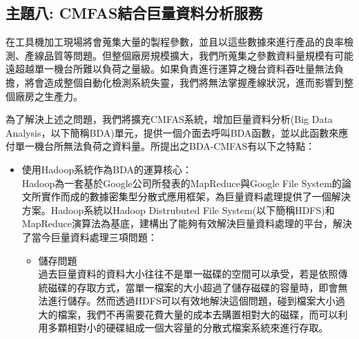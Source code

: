 \documentclass[CJK,12pt,t]{article}
\begin{document}
\begin{CJK*}{UTF8}{bkai}   %









\section{主題八: CMFAS結合巨量資料分析服務}


		在工具機加工現場將會蒐集大量的製程參數，並且以這些數據來進行產品的良率檢測、產線品質等問題。但整個廠房規模擴大，我們所蒐集之參數資料量規模有可能遠超越單一機台所難以負荷之量級。如果負責進行運算之機台資料吞吐量無法負擔，將會造成整個自動化檢測系統失靈，我們將無法掌握產線狀況，進而影響到整個廠房之生產力。

		為了解決上述之問題，我們將擴充CMFAS系統，增加巨量資料分析(Big Data Analysis，以下簡稱BDA)單元，提供一個介面去呼叫BDA函數，並以此函數來應付單一機台所無法負荷之資料量。所提出之BDA-CMFAS有以下之特點：
		\begin{itemize}
		\setlength{\itemsep}{5pt}

			\item 使用Hadoop系統作為BDA的運算核心：\\
				Hadoop為一套基於Google公司所發表的MapReduce與Google File System的論文所實作而成的數據密集型分散式應用框架，為巨量資料處理提供了一個解決方案。Hadoop系統以Hadoop Distrubuted File System(以下簡稱HDFS)和MapReduce演算法為基底，建構出了能夠有效解決巨量資料處理的平台，解決了當今巨量資料處理三項問題：
					\begin{itemize}
					\setlength{\itemsep}{5pt}
						\item 儲存問題\\
							過去巨量資料的資料大小往往不是單一磁碟的空間可以承受，若是依照傳統磁碟的存取方式，當單一檔案的大小超過了儲存磁碟的容量時，即會無法進行儲存。然而透過HDFS可以有效地解決這個問題，碰到檔案大小過大的檔案，我們不再需要花費大量的成本去購置相對大的磁碟，而可以利用多顆相對小的硬碟組成一個大容量的分散式檔案系統來進行存取。


\end{itemize}
\end{itemize}
\end{CJK*}
\end{document}
